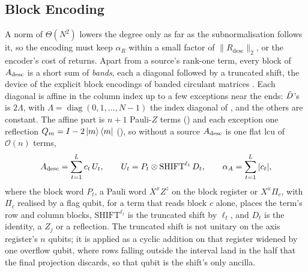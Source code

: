 \subsection{Block Encoding}
\label{sec:descriptor-block-encoding}

A norm of $\Theta(N^2)$ lowers the degree only as far as the subnormalisation follows it, so the encoding must keep $\alpha_R$ within a small factor of $\|R_{\mathrm{desc}}\|_2$, or the encoder's cost of  returns. Apart from a source's rank-one term, every block of $A_{\mathrm{desc}}$ is a short sum of \emph{bands}, each a diagonal followed by a truncated shift, the device of the explicit block encodings of banded circulant matrices \cite{camps2024explicit}. Each diagonal is affine in the column index up to a few exceptions near the ends: $\tilde{D}$'s is $2\Lambda$, with $\Lambda=\operatorname{diag}(0,1,\dots,N-1)$ the index diagonal of , and the others are constant. The affine part is $n+1$ Pauli-$Z$ terms () and each exception one reflection $Q_m=I-2\ket m\bra m$ (), so without a source $A_{\mathrm{desc}}$ is one flat \gls{lcu} of $\mathcal{O}(n)$ terms,
\begin{equation}
    A_{\mathrm{desc}} = \sum_{t=1}^{L} c_t\,U_t,
    \qquad
    U_t = P_t \otimes \mathrm{SHIFT}^{\ell_t}\,D_t,
    \qquad
    \alpha_A = \sum_{t=1}^{L} |c_t|,
    \label{eq:descriptor-lcu}
\end{equation}
where the block word $P_t$, a Pauli word $X^xZ^z$ on the block register or $X^x\Pi_c$, with $\Pi_c$ realised by a flag qubit, for a term that reads block $c$ alone, places the term's row and column blocks, $\mathrm{SHIFT}^{\ell_t}$ is the truncated shift by $\ell_t$, and $D_t$ is the identity, a $Z_j$ or a reflection. The truncated shift is not unitary on the axis register's $n$ qubits; it is applied as a cyclic addition on that register widened by one overflow qubit, where rows falling outside the interval land in the half that the final projection discards, so that qubit is the shift's only ancilla.

